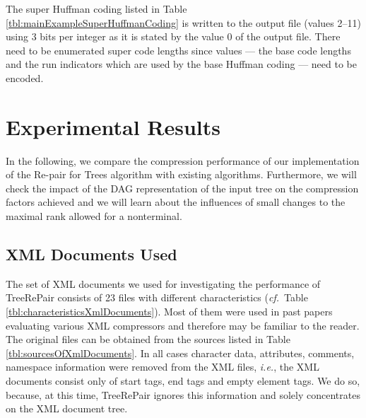\documentclass[12pt]{llncs}
\newcommand{\trp}{\mbox{TreeRePair}\xspace}
\newcommand{\hairsp}{\hspace{1pt}}\newcommand{\TODO}{\textcolor{red}{\bf TODO!}\xspace}
\newcommand{\ie}{\mbox{\textit{i.\hairsp{}e.}}\xspace}
\newcommand{\cf}{\textit{cf.}~}
\begin{document}
The super Huffman coding listed in Table \ref{tbl:mainExampleSuperHuffmanCoding} is written to the output file (values 2--11) using 3 bits per integer as it is stated by the value 0 of the output file. There need to be enumerated  super code lengths since  values --- the base code lengths  and the run indicators  which are used by the base Huffman coding  --- need to be encoded.


\section{Experimental Results}\label{ch:experimentalResults}

In the following, we compare the compression performance of our implementation of the Re-pair for Trees algorithm with existing algorithms. Furthermore, we will check the impact of the DAG representation of the input tree on the compression factors achieved and we will learn about the influences of small changes to the maximal rank allowed for a nonterminal.

\subsection{XML Documents Used}

The set of XML documents we used for investigating the performance of \trp consists of 23 files with different characteristics (\cf Table \ref{tbl:characteristicsXmlDocuments}). Most of them were used in past papers evaluating various XML compressors and therefore may be familiar to the reader. The original files can be obtained from the sources listed in Table \ref{tbl:sourcesOfXmlDocuments}. In all cases character data, attributes, comments, namespace information were removed from the XML files, \ie, the XML documents consist only of start tags, end tags and empty element tags. We do so, because, at this time, \trp ignores this information and solely concentrates on the XML document tree.
\end{document}
